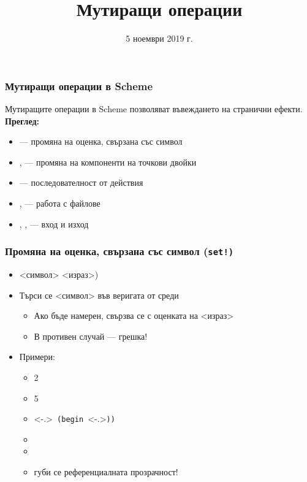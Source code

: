 \documentclass{beamer}
\title{Мутиращи операции}
\date{5 ноември 2019 г.}
\begin{document}
\begin{frame}
  \titlepage
\end{frame}

\begin{frame}
  \frametitle{Мутиращи операции в Scheme}

  Мутиращите операции в Scheme позволяват въвеждането на \alert{странични ефекти}.\\[4ex]
  \pause
  \textbf{Преглед:}
  \begin{itemize}[<+->]
  \item {} --- промяна на оценка, свързана със символ
  \item {},  --- промяна на компоненти на точкови двойки
  \item {} --- последователност от действия
  \item {},  --- работа с файлове
  \item {}, ,  --- вход и изход
  \end{itemize}
\end{frame}

\begin{frame}[fragile]
  \frametitle{Промяна на оценка, свързана със символ (\tt{set!})}

  \begin{itemize}[<+->]
  \item {} <символ> <израз>\tta)
  \item Търси се <символ> във веригата от среди
    \begin{itemize}
    \item Ако бъде намерен, свързва се с оценката на <израз>
    \item В противен случай --- \alert{грешка!}
    \end{itemize}
  \item Примери:
    \begin{itemize}
    \item {}\hspace{3em}2
    \item {}\hspace{4em}5
    \item {}\only<-.>{\tt{ (begin }}\only<-.>{\tt)}\tt)\pause
    \item {}
    \item {}
    \item \alert{губи се референциалната прозрачност!}
    \end{itemize}
  \end{itemize}
\end{frame}
\end{document}
